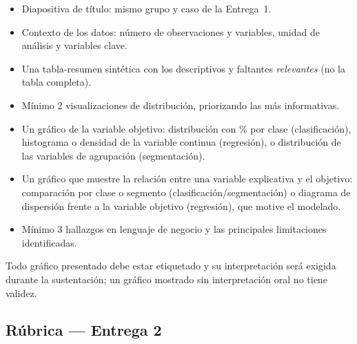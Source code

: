 \documentclass[11pt,letterpaper]{article}
\begin{document}
\begin{itemize}
  \item Diapositiva de título: mismo grupo y caso de la Entrega~1.
  \item Contexto de los datos: número de observaciones y variables, unidad de análisis y variables clave.
  \item Una tabla-resumen sintética con los descriptivos y faltantes \textit{relevantes} (no la tabla completa).
  \item Mínimo 2 visualizaciones de distribución, priorizando las más informativas.
  \item Un gráfico de la variable objetivo: distribución con \% por clase (clasificación), histograma o densidad de la variable continua (regresión), o distribución de las variables de agrupación (segmentación).
  \item Un gráfico que muestre la relación entre una variable explicativa y el objetivo: comparación por clase o segmento (clasificación/segmentación) o diagrama de dispersión frente a la variable objetivo (regresión), que motive el modelado.
  \item Mínimo 3 hallazgos en lenguaje de negocio y las principales limitaciones identificadas.
\end{itemize}

Todo gráfico presentado debe estar etiquetado y su interpretación será exigida durante la sustentación; un gráfico mostrado sin interpretación oral no tiene validez.

\subsection{Rúbrica --- Entrega 2}
\end{document}
